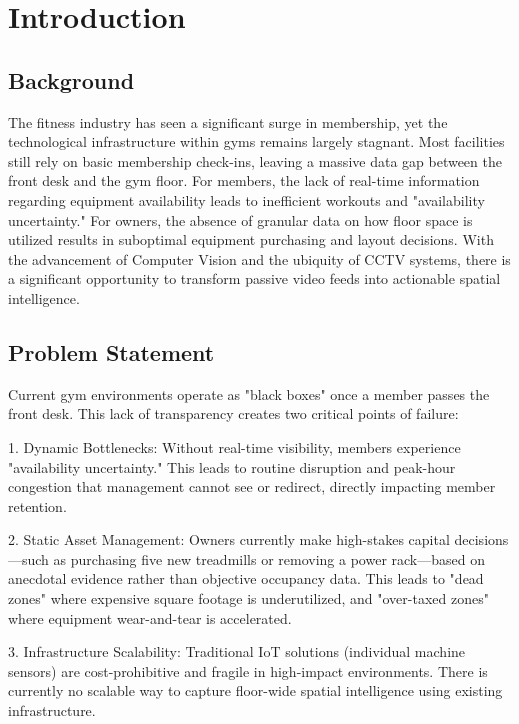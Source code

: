 \chapter{Introduction}
\label{chap:introduction}

\section{Background}
\label{section:background}

The fitness industry has seen a significant surge in membership, yet the technological infrastructure 
within gyms remains largely stagnant. Most facilities still rely on basic membership check-ins, 
leaving a massive data gap between the front desk and the gym floor. For members, the lack of real-time 
information regarding equipment availability leads to inefficient workouts and "availability uncertainty." 
For owners, the absence of granular data on how floor space is utilized results in suboptimal equipment 
purchasing and layout decisions. With the advancement of Computer Vision and the ubiquity of CCTV systems, 
there is a significant opportunity to transform passive video feeds into actionable spatial intelligence.

\section{Problem Statement}
\label{section:problem-statement}

Current gym environments operate as "black boxes" once a member passes the front desk. This lack of 
transparency creates two critical points of failure:

1. Dynamic Bottlenecks: Without real-time visibility, members experience "availability uncertainty." 
This leads to routine disruption and peak-hour congestion that management cannot see or redirect, 
directly impacting member retention.

2. Static Asset Management: Owners currently make high-stakes capital decisions—such as purchasing 
five new treadmills or removing a power rack—based on anecdotal evidence rather than objective 
occupancy data. This leads to "dead zones" where expensive square footage is underutilized, 
and "over-taxed zones" where equipment wear-and-tear is accelerated.

3. Infrastructure Scalability: Traditional IoT solutions (individual machine sensors) are cost-prohibitive 
and fragile in high-impact environments. There is currently no scalable way to capture floor-wide 
spatial intelligence using existing infrastructure.

